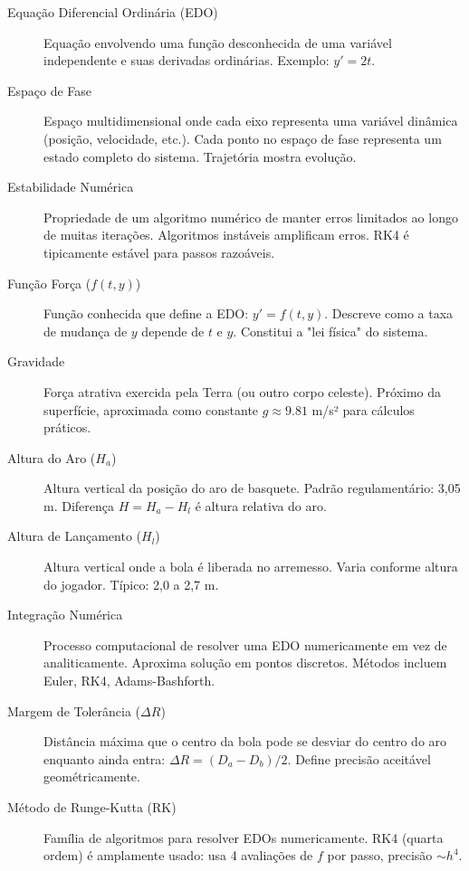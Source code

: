 \documentclass[12pt,a4paper]{article}
\begin{document}
\begin{description}
    \item[Equação Diferencial Ordinária (EDO)] Equação envolvendo uma função desconhecida de uma variável independente e suas derivadas ordinárias. Exemplo: $y' = 2t$.
    
    \item[Espaço de Fase] Espaço multidimensional onde cada eixo representa uma variável dinâmica (posição, velocidade, etc.). Cada ponto no espaço de fase representa um estado completo do sistema. Trajetória mostra evolução.
    
    \item[Estabilidade Numérica] Propriedade de um algoritmo numérico de manter erros limitados ao longo de muitas iterações. Algoritmos instáveis amplificam erros. RK4 é tipicamente estável para passos razoáveis.
    
    \item[Função Força ($f(t,y)$)] Função conhecida que define a EDO: $y' = f(t,y)$. Descreve como a taxa de mudança de $y$ depende de $t$ e $y$. Constitui a "lei física" do sistema.
    
    \item[Gravidade] Força atrativa exercida pela Terra (ou outro corpo celeste). Próximo da superfície, aproximada como constante $g \approx 9.81$ m/s² para cálculos práticos.
    
    \item[Altura do Aro ($H_a$)] Altura vertical da posição do aro de basquete. Padrão regulamentário: 3,05 m. Diferença $H = H_a - H_l$ é altura relativa do aro.
    
    \item[Altura de Lançamento ($H_l$)] Altura vertical onde a bola é liberada no arremesso. Varia conforme altura do jogador. Típico: 2,0 a 2,7 m.
    
    \item[Integração Numérica] Processo computacional de resolver uma EDO numericamente em vez de analiticamente. Aproxima solução em pontos discretos. Métodos incluem Euler, RK4, Adams-Bashforth.
    
    \item[Margem de Tolerância ($\Delta R$)] Distância máxima que o centro da bola pode se desviar do centro do aro enquanto ainda entra: $\Delta R = (D_a - D_b)/2$. Define precisão aceitável geométricamente.
    
    \item[Método de Runge-Kutta (RK)] Família de algoritmos para resolver EDOs numericamente. RK4 (quarta ordem) é amplamente usado: usa 4 avaliações de $f$ por passo, precisão $\sim h^4$.
    

\end{description}
\end{document}
